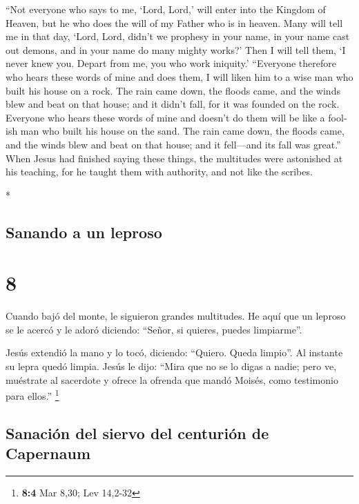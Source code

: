 \begin{paracol}{2}
\begin{otherlanguage}{english}
 ``Not everyone who says to me, `Lord, Lord,' will enter
into the Kingdom of Heaven, but he who does the will of my Father who is
in heaven.  Many will tell me in that day, `Lord, Lord,
didn't we prophesy in your name, in your name cast out demons, and in
your name do many mighty works?'  Then I will tell them,
`I never knew you. Depart from me, you who work iniquity.'
 ``Everyone therefore who hears these words of mine and
does them, I will liken him to a wise man who built his house on a rock.
 The rain came down, the floods came, and the winds blew
and beat on that house; and it didn't fall, for it was founded on the
rock.  Everyone who hears these words of mine and doesn't
do them will be like a foolish man who built his house on the sand.
 The rain came down, the floods came, and the winds blew
and beat on that house; and it fell---and its fall was great.''
 When Jesus had finished saying these things, the
multitudes were astonished at his teaching,  for he
taught them with authority, and not like the scribes.

\end{otherlanguage}

\switchcolumn[0]*

\hypertarget{sanando-a-un-leproso}{%
\subsection{Sanando a un leproso}\label{sanando-a-un-leproso}}

\hypertarget{section-14}{%
\section{8}\label{section-14}}

 Cuando bajó del monte, le siguieron grandes multitudes.
 He aquí que un leproso se le acercó y le adoró diciendo:
``Señor, si quieres, puedes limpiarme''.

 Jesús extendió la mano y lo tocó, diciendo: ``Quiero.
Queda limpio''. Al instante su lepra quedó limpia.  Jesús
le dijo: ``Mira que no se lo digas a nadie; pero ve, muéstrate al
sacerdote y ofrece la ofrenda que mandó Moisés, como testimonio para
ellos.'' \footnote{\textbf{8:4} Mar 8,30; Lev 14,2-32}

\hypertarget{sanaciuxf3n-del-siervo-del-centuriuxf3n-de-capernaum}{%
\subsection{Sanación del siervo del centurión de
Capernaum}\label{sanaciuxf3n-del-siervo-del-centuriuxf3n-de-capernaum}}


\end{paracol}
